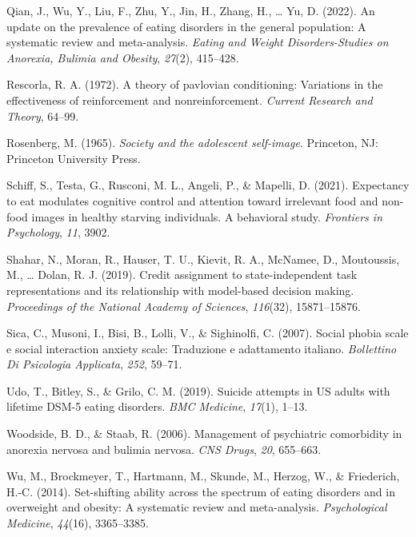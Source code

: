 \documentclass[
  man,floatsintext]{apa6}
\newlength{\cslhangindent}
\newlength{\cslentryspacingunit} %
\newenvironment{CSLReferences}[2] %
 {%
  \setlength{\parindent}{0pt}
  \ifodd #1
  \let\oldpar\par
  \def\par{\hangindent=\cslhangindent\oldpar}
  \fi
  \setlength{\parskip}{#2\cslentryspacingunit}
 }%
 {}
\begin{document}
\begin{CSLReferences}{1}{0}
\leavevmode{}%
Qian, J., Wu, Y., Liu, F., Zhu, Y., Jin, H., Zhang, H., \ldots{} Yu, D. (2022). An update on the prevalence of eating disorders in the general population: A systematic review and meta-analysis. \emph{Eating and Weight Disorders-Studies on Anorexia, Bulimia and Obesity}, \emph{27}(2), 415--428.

\leavevmode{}%
Rescorla, R. A. (1972). A theory of pavlovian conditioning: Variations in the effectiveness of reinforcement and nonreinforcement. \emph{Current Research and Theory}, 64--99.

\leavevmode{}%
Rosenberg, M. (1965). \emph{Society and the adolescent self-image}. Princeton, NJ: Princeton University Press.

\leavevmode{}%
Schiff, S., Testa, G., Rusconi, M. L., Angeli, P., \& Mapelli, D. (2021). Expectancy to eat modulates cognitive control and attention toward irrelevant food and non-food images in healthy starving individuals. A behavioral study. \emph{Frontiers in Psychology}, \emph{11}, 3902.

\leavevmode{}%
Shahar, N., Moran, R., Hauser, T. U., Kievit, R. A., McNamee, D., Moutoussis, M., \ldots{} Dolan, R. J. (2019). Credit assignment to state-independent task representations and its relationship with model-based decision making. \emph{Proceedings of the National Academy of Sciences}, \emph{116}(32), 15871--15876.

\leavevmode{}%
Sica, C., Musoni, I., Bisi, B., Lolli, V., \& Sighinolfi, C. (2007). Social phobia scale e social interaction anxiety scale: Traduzione e adattamento italiano. \emph{Bollettino Di Psicologia Applicata}, \emph{252}, 59--71.

\leavevmode{}%
Udo, T., Bitley, S., \& Grilo, C. M. (2019). Suicide attempts in US adults with lifetime DSM-5 eating disorders. \emph{BMC Medicine}, \emph{17}(1), 1--13.

\leavevmode{}%
Woodside, B. D., \& Staab, R. (2006). Management of psychiatric comorbidity in anorexia nervosa and bulimia nervosa. \emph{CNS Drugs}, \emph{20}, 655--663.

\leavevmode{}%
Wu, M., Brockmeyer, T., Hartmann, M., Skunde, M., Herzog, W., \& Friederich, H.-C. (2014). Set-shifting ability across the spectrum of eating disorders and in overweight and obesity: A systematic review and meta-analysis. \emph{Psychological Medicine}, \emph{44}(16), 3365--3385.

\end{CSLReferences}
\end{document}

